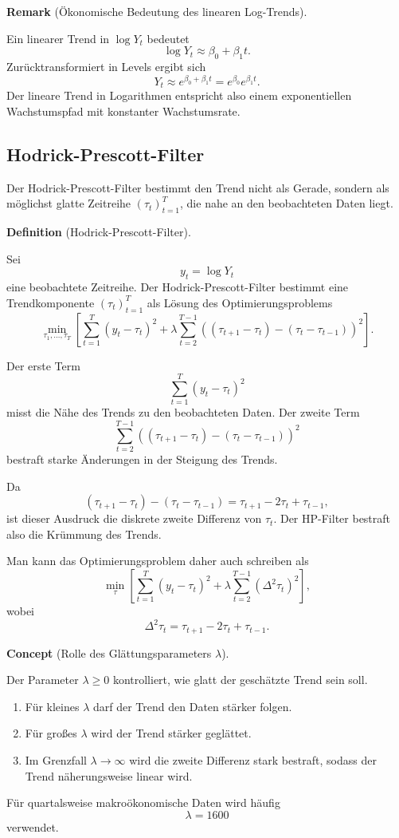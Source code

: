 \documentclass[10pt, letterpaper]{article}
\newcommand{\CustomHeading}[3]{%
  \par\medskip\noindent%
  \textbf{#1 #2} \textnormal{(#3)}.\enskip%
}
\newenvironment{DEF}[2]{\CustomHeading{Definition}{#1}{#2}}{}
\newenvironment{REM}[2]{\CustomHeading{Remark}{#1}{#2}}{}
\newenvironment{CONC}[2]{\CustomHeading{Concept}{#1}{#2}}{}
\begin{document}
\begin{REM}{}{Ökonomische Bedeutung des linearen Log-Trends}
Ein linearer Trend in \(\log Y_t\) bedeutet
\[
\log Y_t \approx \beta_0+\beta_1t.
\]
Zurücktransformiert in Levels ergibt sich
\[
Y_t \approx e^{\beta_0+\beta_1t}
=
e^{\beta_0}e^{\beta_1t}.
\]
Der lineare Trend in Logarithmen entspricht also einem exponentiellen Wachstumspfad mit konstanter Wachstumsrate.
\end{REM}

\subsection{Hodrick-Prescott-Filter}

Der Hodrick-Prescott-Filter bestimmt den Trend nicht als Gerade, sondern als möglichst glatte Zeitreihe \((\tau_t)_{t=1}^T\), die nahe an den beobachteten Daten liegt.

\begin{DEF}{}{Hodrick-Prescott-Filter}
Sei
\[
y_t=\log Y_t
\]
eine beobachtete Zeitreihe. Der Hodrick-Prescott-Filter bestimmt eine Trendkomponente \((\tau_t)_{t=1}^T\) als Lösung des Optimierungsproblems
\[
\min_{\tau_1,\dots,\tau_T}
\left[
\sum_{t=1}^T (y_t-\tau_t)^2
+
\lambda
\sum_{t=2}^{T-1}
\left(
(\tau_{t+1}-\tau_t)-(\tau_t-\tau_{t-1})
\right)^2
\right].
\]
\end{DEF}

Der erste Term
\[
\sum_{t=1}^T (y_t-\tau_t)^2
\]
misst die Nähe des Trends zu den beobachteten Daten. Der zweite Term
\[
\sum_{t=2}^{T-1}
\left(
(\tau_{t+1}-\tau_t)-(\tau_t-\tau_{t-1})
\right)^2
\]
bestraft starke Änderungen in der Steigung des Trends.

Da
\[
(\tau_{t+1}-\tau_t)-(\tau_t-\tau_{t-1})
=
\tau_{t+1}-2\tau_t+\tau_{t-1},
\]
ist dieser Ausdruck die diskrete zweite Differenz von \(\tau_t\). Der HP-Filter bestraft also die Krümmung des Trends.

Man kann das Optimierungsproblem daher auch schreiben als
\[
\min_{\tau}
\left[
\sum_{t=1}^T (y_t-\tau_t)^2
+
\lambda
\sum_{t=2}^{T-1}
(\Delta^2\tau_t)^2
\right],
\]
wobei
\[
\Delta^2\tau_t
=
\tau_{t+1}-2\tau_t+\tau_{t-1}.
\]

\begin{CONC}{}{Rolle des Glättungsparameters \(\lambda\)}
Der Parameter \(\lambda\geq 0\) kontrolliert, wie glatt der geschätzte Trend sein soll.
\begin{enumerate}
    \item Für kleines \(\lambda\) darf der Trend den Daten stärker folgen.
    \item Für großes \(\lambda\) wird der Trend stärker geglättet.
    \item Im Grenzfall \(\lambda\to\infty\) wird die zweite Differenz stark bestraft, sodass der Trend näherungsweise linear wird.
\end{enumerate}
Für quartalsweise makroökonomische Daten wird häufig
\[
\lambda=1600
\]
verwendet.
\end{CONC}
\end{document}
